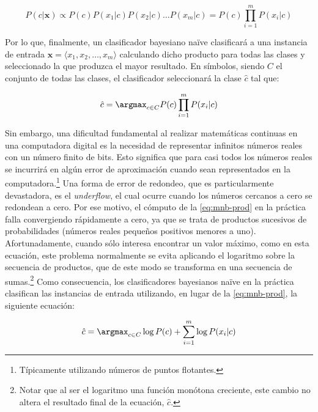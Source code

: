 $$P(c|\pmb{x}) \propto P(c)P(x_1|c)P(x_2|c)\dots P(x_m|c) = P(c)\displaystyle\prod_{i=1}^{m}P(x_i|c)$$

Por lo que, finalmente, un clasificador bayesiano naïve clasificará a una instancia de entrada $\pmb{x}=\langle x_1,x_2,\dots,x_m\rangle$ calculando dicho producto para todas las clases y  seleccionado la que produzca el mayor resultado. En símbolos, siendo $C$ el conjunto de todas las clases, el clasificador seleccionará la clase $\hat{c}$ tal que:

\begin{equation}
\hat{c}=\argmax_{c\in C} P(c)\displaystyle\prod_{i=1}^{m}P(x_i|c)
\label{eq:mnb-prod}
\end{equation}

Sin embargo, una dificultad fundamental al realizar matemáticas continuas en una computadora digital es la necesidad de representar infinitos números reales con un número finito de bits. Esto significa que para casi todos los números reales se incurrirá en algún error de aproximación cuando sean representados en la computadora.\footnote{Típicamente utilizando números de puntos flotantes.} Una forma de error de redondeo, que es particularmente devastadora, es el \emph{underflow}, el cual ocurre cuando los números cercanos a cero se redondean a cero.
Por ese motivo, el cómputo de la \autoref{eq:mnb-prod} en la práctica falla convergiendo rápidamente a cero, ya que se trata de productos sucesivos de probabilidades (números reales pequeños positivos menores a uno). 
Afortunadamente, cuando sólo interesa encontrar un valor máximo, como en esta ecuación, este problema normalmente se evita aplicando el logaritmo sobre la secuencia de productos, que de este modo se transforma en una secuencia de sumas.\footnote{Notar que al ser el logaritmo una función monótona creciente, este cambio no altera el resultado final de la ecuación, $\hat{c}$.}
Como consecuencia, los clasificadores bayesianos naïve en la práctica clasifican las instancias de entrada utilizando, en lugar de la \autoref{eq:mnb-prod}, la siguiente ecuación:


\begin{equation}
\hat{c}=\argmax_{c\in C} \log{P(c)}+\sum_{i=1}^{m}\log{P(x_i|c)}
\label{eq:mnb-log}
\end{equation}

